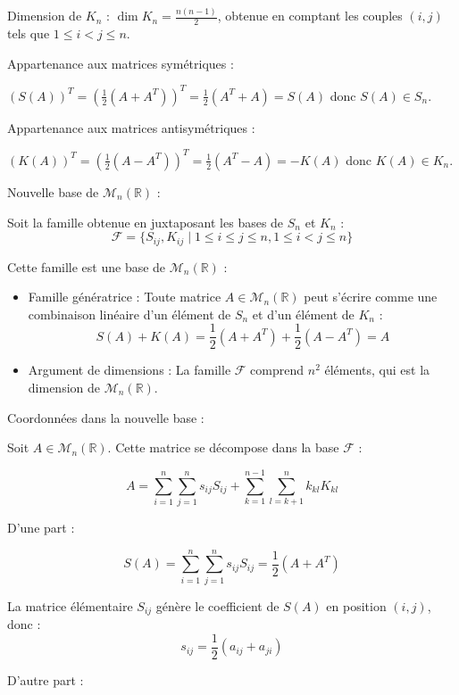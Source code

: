 \documentclass[10pt,a4paper]{article}
\begin{document}
Dimension de $K_n$ : $ \dim K_n = \frac{n(n-1)}{2}$, obtenue en comptant les couples $(i,j)$ tels que
$1 \leq i < j \leq n$.

\q Appartenance aux matrices symétriques :

$(S(A))^T = (\frac{1}{2} (A + A^T))^T = \frac{1}{2} (A^T + A) = S(A)$ donc $S(A) \in S_n$.

Appartenance aux matrices antisymétriques :

$ (K(A))^T = (\frac{1}{2} (A - A^T))^T = \frac{1}{2} (A^T - A) = -K(A)$ donc $K(A) \in K_n$.

\q Nouvelle base de $\mathcal{M}_n(\mathbb{R})$ :

Soit la famille obtenue en juxtaposant les bases de $S_n$ et $K_n$ :
$$\mathcal{F} = \{S_{ij}, K_{ij} \mid 1 \leq i \leq j \leq n, 1 \leq i < j \leq n\}$$

Cette famille est une base de $\mathcal{M}_n(\mathbb{R})$ :
\begin{itemize}
    \item Famille génératrice : Toute matrice $A \in \mathcal{M}_n(\mathbb{R})$ peut s'écrire comme une
    combinaison linéaire d'un élément de $S_n$ et d'un élément de $K_n$ :
    $$ S(A) + K(A) = \frac{1}{2} (A + A^T) + \frac{1}{2} (A - A^T) = A $$
    \item Argument de dimensions : La famille $\mathcal{F}$ comprend $n^2$ éléments, qui est la
    dimension de $\mathcal{M}_n(\mathbb{R})$.
\end{itemize}

\q Coordonnées dans la nouvelle base :

Soit $A \in \mathcal{M}_n(\mathbb{R})$. Cette matrice se décompose dans la base $\mathcal{F}$ :

$$ A = \sum_{i=1}^n \sum_{j=1}^n s_{ij} S_{ij} + \sum_{k=1}^{n-1} \sum_{l=k+1}^n k_{kl} K_{kl} $$

D'une part :

$$ S(A) = \sum_{i=1}^n \sum_{j=1}^n s_{ij} S_{ij} = \frac{1}{2} (A + A^T) $$

La matrice élémentaire $S_{ij}$ génère le coefficient de $S(A)$ en position $(i,j)$, donc :
$$s_{ij} = \frac{1}{2} (a_{ij} + a_{ji})$$

D'autre part :
\end{document}
